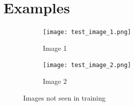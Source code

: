 \documentclass[a4paper,11pt]{report}
\begin{document}
        \section{Examples}
            \begin{figure}[h]
                \centering
                \begin{subfigure}{0.45\textwidth}
                    \centering
                    \texttt{[image: test\_image\_1.png]}
                    \caption{Image 1}
                    \label{fig:test_image_1}
                \end{subfigure}
                \hfill
                \begin{subfigure}{0.45\textwidth}
                    \centering
                    \texttt{[image: test\_image\_2.png]}
                    \caption{Image 2}
                    \label{fig:test_image_2}
                \end{subfigure}
                \caption{Images not seen in training}
                \label{fig:subsection-test}
            \end{figure}
\end{document}
